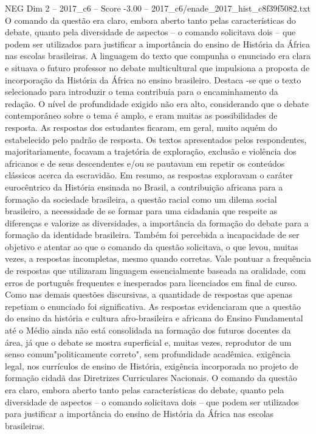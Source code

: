 \begin{textsample}{NEG Dim 2 – 2017\_c6 – Score -3.00 – 2017\_c6/enade\_2017\_hist\_c8f39f5082.txt}
O comando da questão era claro, embora aberto tanto pelas características do debate, quanto pela diversidade de aspectos – o comando solicitava dois – que podem ser utilizados para justificar a importância do ensino de História da África nas escolas brasileiras.
A linguagem do texto que compunha o enunciado era clara e situava o futuro professor no debate multicultural que impulsiona a proposta de incorporação da História da África no ensino brasileiro.
Destaca -se que o texto selecionado para introduzir o tema contribuía para o encaminhamento da redação.
O nível de profundidade exigido não era alto, considerando que o debate contemporâneo sobre o tema é amplo, e eram muitas as possibilidades de resposta.
As respostas dos estudantes ficaram, em geral, muito aquém do estabelecido pelo padrão de resposta.
Os textos apresentados pelos respondentes, majoritariamente, focavam a trajetória de exploração, exclusão e violência dos africanos e de seus descendentes e/ou se pautavam em repetir os conteúdos clássicos acerca da escravidão.
Em resumo, as respostas exploravam o caráter eurocêntrico da História ensinada no Brasil, a contribuição africana para a formação da sociedade brasileira, a questão racial como um dilema social brasileiro, a necessidade de se formar para uma cidadania que respeite as diferenças e valorize as diversidades, a importância da formação do debate para a formação da identidade brasileira.
Também foi percebida a incapacidade de ser objetivo e atentar ao que o comando da questão solicitava, o que levou, muitas vezes, a respostas incompletas, mesmo quando corretas.
Vale pontuar a frequência de respostas que utilizaram linguagem essencialmente baseada na oralidade, com erros de português frequentes e inesperados para licenciados em final de curso.
Como nas demais questões discursivas, a quantidade de respostas que apenas repetiam o enunciado foi significativa.
As respostas evidenciaram que a questão do ensino da história e cultura afro-brasileira e africana do Ensino Fundamental até o Médio ainda não está consolidada na formação dos futuros docentes da área, já que o debate se mostra superficial e, muitas vezes, reprodutor de um senso comum"politicamente correto", sem profundidade acadêmica. exigência legal, nos currículos de ensino de História, exigência incorporada no projeto de formação cidadã das Diretrizes Curriculares Nacionais.
O comando da questão era claro, embora aberto tanto pelas características do debate, quanto pela diversidade de aspectos – o comando solicitava dois – que podem ser utilizados para justificar a importância do ensino de História da África nas escolas brasileiras.

\end{textsample}
